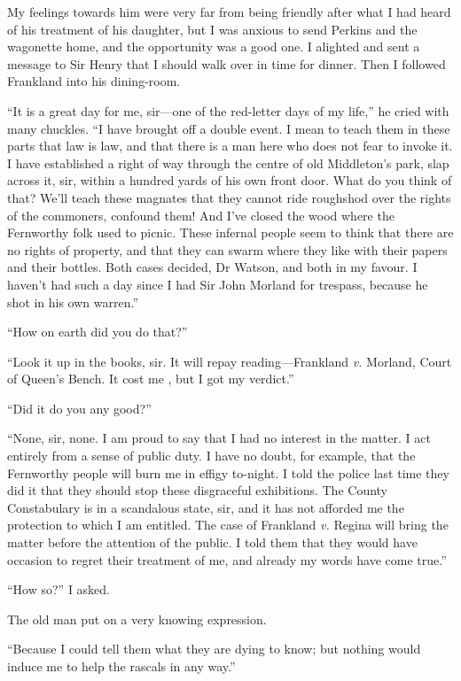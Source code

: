 \documentclass[paper=5.5in:8.5in,BCOR=7mm,twoside,DIV=calc,12pt,usegeometry,openany,chapterprefix,endperiod]{scrbook} %
\begin{document}
My feelings towards him were very far from being friendly after what I had heard of his treatment of his daughter, but I was anxious to send Perkins and the wagonette home, and the opportunity was a good one. I alighted and sent a message to Sir Henry that I should walk over in time for dinner. Then I followed Frankland into his dining-room.

\enquote{It is a great day for me, sir\nobreakdash---one of the red-letter days of my life,} he cried with many chuckles. \enquote{I have brought off a double event. I mean to teach them in these parts that law is law, and that there is a man here who does not fear to invoke it. I have established a right of way through the centre of old Middleton's park, slap across it, sir, within a hundred yards of his own front door. What do you think of that? We'll teach these magnates that they cannot ride roughshod over the rights of the commoners, confound them! And I've closed the wood where the Fernworthy folk used to picnic. These infernal people seem to think that there are no rights of property, and that they can swarm where they like with their papers and their bottles. Both cases decided, Dr Watson, and both in my favour. I haven't had such a day since I had Sir John Morland for trespass, because he shot in his own warren.}

\enquote{How on earth did you do that?}

\enquote{Look it up in the books, sir. It will repay reading\nobreakdash---Frankland \textit{v.} Morland, Court of Queen's Bench. It cost me , but I got my verdict.}

\enquote{Did it do you any good?}

\enquote{None, sir, none. I am proud to say that I had no interest in the matter. I act entirely from a sense of public duty. I have no doubt, for example, that the Fernworthy people will burn me in effigy to-night. I told the police last time they did it that they should stop these disgraceful exhibitions. The County Constabulary is in a scandalous state, sir, and it has not afforded me the protection to which I am entitled. The case of Frankland \textit{v.} Regina will bring the matter before the attention of the public. I told them that they would have occasion to regret their treatment of me, and already my words have come true.}

\enquote{How so?} I asked.

The old man put on a very knowing expression.

\enquote{Because I could tell them what they are dying to know; but nothing would induce me to help the rascals in any way.}
\end{document}
